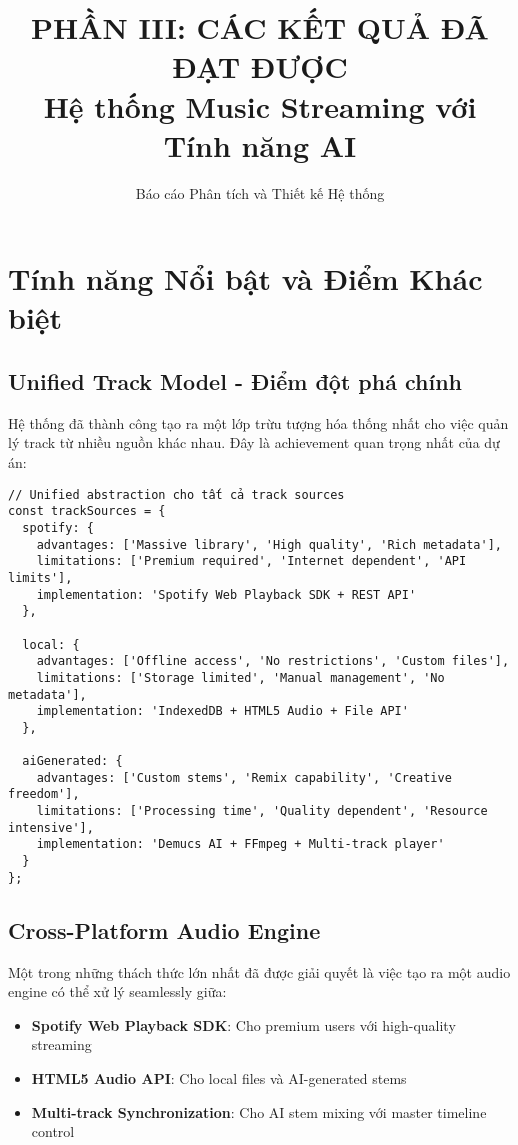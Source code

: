 \documentclass[12pt,a4paper]{article}
\title{\textbf{PHẦN III: CÁC KẾT QUẢ ĐÃ ĐẠT ĐƯỢC\\Hệ thống Music Streaming với Tính năng AI}}
\author{Báo cáo Phân tích và Thiết kế Hệ thống}
\date{}
\begin{document}
\maketitle

\section{Tính năng Nổi bật và Điểm Khác biệt}

\subsection{Unified Track Model - Điểm đột phá chính}

Hệ thống đã thành công tạo ra một lớp trừu tượng hóa thống nhất cho việc quản lý track từ nhiều nguồn khác nhau. Đây là achievement quan trọng nhất của dự án:

\begin{lstlisting}[caption={Unified abstraction cho tất cả track sources}]
// Unified abstraction cho tất cả track sources
const trackSources = {
  spotify: {
    advantages: ['Massive library', 'High quality', 'Rich metadata'],
    limitations: ['Premium required', 'Internet dependent', 'API limits'],
    implementation: 'Spotify Web Playback SDK + REST API'
  },
  
  local: {
    advantages: ['Offline access', 'No restrictions', 'Custom files'],
    limitations: ['Storage limited', 'Manual management', 'No metadata'],
    implementation: 'IndexedDB + HTML5 Audio + File API'
  },
  
  aiGenerated: {
    advantages: ['Custom stems', 'Remix capability', 'Creative freedom'],
    limitations: ['Processing time', 'Quality dependent', 'Resource intensive'],
    implementation: 'Demucs AI + FFmpeg + Multi-track player'
  }
};
\end{lstlisting}

\subsection{Cross-Platform Audio Engine}

Một trong những thách thức lớn nhất đã được giải quyết là việc tạo ra một audio engine có thể xử lý seamlessly giữa:

\begin{itemize}
\item \textbf{Spotify Web Playback SDK}: Cho premium users với high-quality streaming
\item \textbf{HTML5 Audio API}: Cho local files và AI-generated stems  
\item \textbf{Multi-track Synchronization}: Cho AI stem mixing với master timeline control
\end{itemize}
\end{document}
